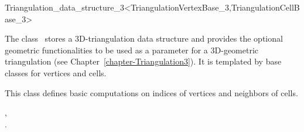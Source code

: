 

\begin{ccRefClass}{Triangulation_data_structure_3<TriangulationVertexBase_3,TriangulationCellBase_3>}  %


\ccDefinition
The class \ccRefName\ stores a 3D-triangulation data structure
and provides the optional
geometric functionalities to be used as a parameter for a 
3D-geometric triangulation (see Chapter~\ref{chapter-Triangulation3}). 
It is templated by base classes for vertices and cells.

\ccIsModel



This class  defines basic computations on
indices of vertices and neighbors of cells. 


\ccSeeAlso

,\\
.




\end{ccRefClass}


